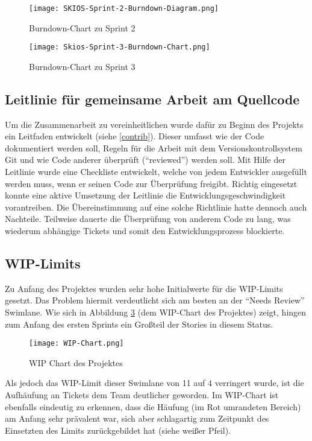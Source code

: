 \begin{figure}[H]
    \texttt{[image: SKIOS-Sprint-2-Burndown-Diagram.png]}
    \caption{Burndown-Chart zu Sprint 2}
    \label{fig:SKIOS-Sprint-2-Burndown}
\end{figure}

\begin{figure}
    \texttt{[image: Skios-Sprint-3-Burndown-Chart.png]}
    \caption{Burndown-Chart zu Sprint 3}
    \label{fig:SKIOS-Sprint-3-Burndown}
\end{figure}


\subsection{Leitlinie für gemeinsame Arbeit am Quellcode}
Um die Zusammenarbeit zu vereinheitlichen wurde dafür zu Beginn des Projekts ein Leitfaden entwickelt (siehe \ref{contrib}).
Dieser umfasst wie der Code dokumentiert werden soll, Regeln für die Arbeit mit dem Versionskontrollsystem Git 
und wie Code anderer überprüft (\enquote{reviewed}) werden soll. Mit Hilfe der Leitlinie wurde eine Checkliste entwickelt, 
welche von jedem Entwickler ausgefüllt werden muss, wenn er seinen Code zur Überprüfung freigibt. Richtig
eingesetzt konnte eine aktive Umsetzung der Leitlinie die Entwicklungsgeschwindigkeit vorantreiben. Die 
Übereinstimmung auf eine solche Richtlinie hatte dennoch auch Nachteile. Teilweise dauerte die Überprüfung von 
anderem Code zu lang, was wiederum abhängige Tickets und somit den Entwicklungsprozess blockierte.

\subsection{WIP-Limits}
Zu Anfang des Projektes wurden sehr hohe Initialwerte für die \ac{WIP}-Limits gesetzt.
Das Problem hiermit verdeutlicht sich am besten an der \enquote{Needs Review} Swimlane.
Wie sich in Abbildung \ref{fig:WIP} (dem \ac{WIP}-Chart des Projektes) zeigt, hingen zum Anfang des ersten Sprints ein Großteil der Stories in diesem Status.

\begin{figure}
    \centering
    \texttt{[image: WIP-Chart.png]}
    \caption{WIP Chart des Projektes}
    \label{fig:WIP}
\end{figure}

Als jedoch das \ac{WIP}-Limit dieser Swimlane von 11 auf 4 verringert wurde, ist die Aufhäufung an Tickets dem Team deutlicher geworden.
Im \ac{WIP}-Chart ist ebenfalls eindeutig zu erkennen, dass die Häufung (im Rot umrandeten Bereich) am Anfang sehr prävalent war, sich aber schlagartig zum Zeitpunkt des Einsetzten des Limits zurückgebildet hat (siehe weißer Pfeil).


